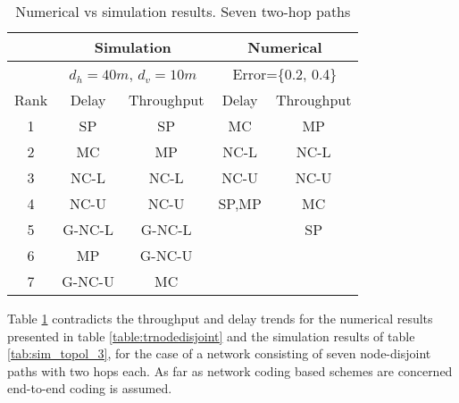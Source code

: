 \documentclass[journal, onecolumn, 12pt]{IEEEtran}
\begin{document}
\begin{table}[h]
\begin{center}
\scriptsize
\begin{tabular}{|c|c|c|c|c|}
\hline
     & \multicolumn{2}{|c|}{Simulation}     & \multicolumn{2}{|c|}{Numerical}                                   \\ \hline
     & \multicolumn{2}{|c|}{$d_{h}=40m$, $d_{v}=10m$} & \multicolumn{2}{|c|}{Error=\{0.2, 0.4\}} \\ \hline
Rank & Delay               & Throughput              & Delay            & Throughput            \\ \hline
1    & SP                 & SP                & MC              & MP          \\ \hline
2    & MC                 & MP                & NC-L              & NC-L      \\ \hline
3    & NC-L                & NC-L                & NC-U              & NC-U   \\ \hline
4    & NC-U                 & NC-U                & SP,MP              & MC   \\ \hline
5    & G-NC-L                 & G-NC-L                &               & SP     \\ \hline
6    & MP                 & G-NC-U                &               &           \\ \hline
7    & G-NC-U                 & MC                &               &           \\ \hline
\end{tabular}
\end{center}
\caption {Numerical vs simulation results. Seven two-hop paths}
\label{tab:comp_2}
\end{table}

Table \ref{tab:comp_2} contradicts the throughput and delay trends for the numerical results presented in table \ref{table:trnodedisjoint} and the simulation results of table \ref{tab:sim_topol_3},
for the case of a network consisting of seven node-disjoint paths with two hops each.
As far as network coding based schemes are concerned end-to-end coding is assumed.
\end{document}
